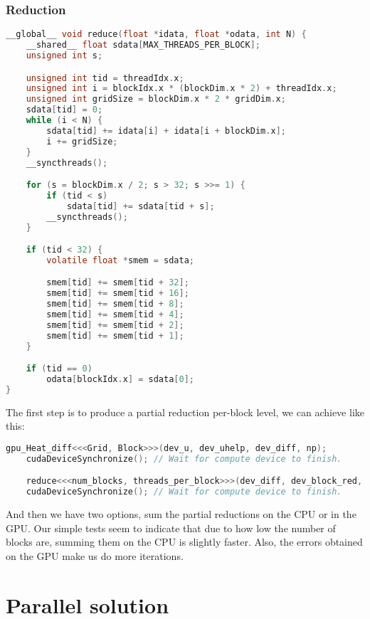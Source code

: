 \documentclass[a4paper, 10pt]{article}
\begin{document}
\subsubsection{Reduction}
\begin{lstlisting}[language=c, caption={Reduction kernel}]
__global__ void reduce(float *idata, float *odata, int N) {
    __shared__ float sdata[MAX_THREADS_PER_BLOCK];
    unsigned int s;

    unsigned int tid = threadIdx.x;
    unsigned int i = blockIdx.x * (blockDim.x * 2) + threadIdx.x;
    unsigned int gridSize = blockDim.x * 2 * gridDim.x;
    sdata[tid] = 0;
    while (i < N) {
        sdata[tid] += idata[i] + idata[i + blockDim.x];
        i += gridSize;
    }
    __syncthreads();

    for (s = blockDim.x / 2; s > 32; s >>= 1) {
        if (tid < s)
            sdata[tid] += sdata[tid + s];
        __syncthreads();
    }

    if (tid < 32) {
        volatile float *smem = sdata;

        smem[tid] += smem[tid + 32];
        smem[tid] += smem[tid + 16];
        smem[tid] += smem[tid + 8];
        smem[tid] += smem[tid + 4];
        smem[tid] += smem[tid + 2];
        smem[tid] += smem[tid + 1];
    }

    if (tid == 0)
        odata[blockIdx.x] = sdata[0];
}
\end{lstlisting}

The first step is to produce a partial reduction per-block level, we can achieve like this:
\begin{lstlisting}[language=c, caption={Reduction}, label={lst:cudareduction_block}]
    gpu_Heat_diff<<<Grid, Block>>>(dev_u, dev_uhelp, dev_diff, np);
    cudaDeviceSynchronize(); // Wait for compute device to finish.

    reduce<<<num_blocks, threads_per_block>>>(dev_diff, dev_block_red, (np - 2) * (np - 2));
    cudaDeviceSynchronize(); // Wait for compute device to finish.
\end{lstlisting}

And then we have two options, sum the partial reductions on the CPU or in the GPU. Our simple tests seem to indicate
that due to how low the number of blocks are, summing them on the CPU is slightly faster. Also, the errors obtained on the GPU
make us do more iterations.
\clearpage
\section{Parallel solution}
\label{sec:results}
\end{document}
